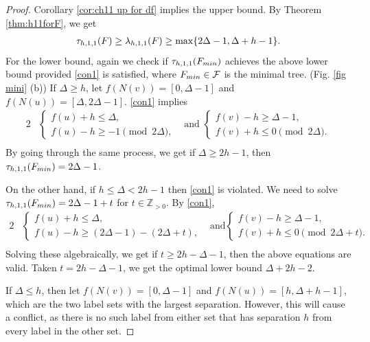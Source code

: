 \begin{proof}
Corollary \ref{cor:ch11 up for df} implies the upper bound. By Theorem \ref{thm:h11forF}, we get 
\begin{align*}
\tau_{h,1,1}(F) \ge \lambda_{h,1,1}(F) \ge \max\{2\Delta-1, \Delta+h-1\}.
\end{align*}
For the lower bound, again we check if $\tau_{h,1,1}(F_{min})$ achieves the above lower bound provided \eqref{con1} is satisfied, where $F_{min} \in {\cal F}$ is the minimal tree. (Fig. \ref{fig mini} (b)) If $\Delta \ge h$, let $f(N(v)) = [0,\Delta-1]$ and $f(N(u)) = [\Delta, 2\Delta-1]$. \eqref{con1} implies 
\begin{alignat*}{2}
 &\begin{cases}
 f(u) + h \le \Delta, \\ 
 f(u) -h \ge -1 \pmod{2\Delta},
 \end{cases}
 &\text{and    } 
 \begin{cases}
 f(v) - h \ge \Delta-1 ,\\
 f(v) + h \le 0 \pmod{2\Delta}.
 \end{cases} \\
\end{alignat*}
By going through the same process, we get if $\Delta \ge 2h-1$, then $\tau_{h,1,1}(F_{min}) = 2\Delta -1$.

On the other hand, if $h \le \Delta < 2h-1$ then \eqref{con1} is violated. We need to solve $\tau_{h,1,1}(F_{min}) = 2\Delta-1+t$ for $t \in \mathbb{Z}_{>0}$. By \eqref{con1},
\begin{alignat*}{2}
 &\begin{cases}
 f(u) + h \le \Delta, \\ 
 f(u) -h \ge (2\Delta-1)-(2\Delta+t),
 \end{cases}
 & \text{and}
 \begin{cases}
 f(v) - h \ge \Delta -1 ,\\
f(v) +h \le 0 \pmod{2\Delta+t}.
 \end{cases} \\
\end{alignat*}
Solving these algebraically, we get if $t \ge 2h-\Delta-1$, then the above equations are valid. Taken $t = 2h-\Delta-1$, we get the optimal lower bound $\Delta + 2h-2$. 

If $\Delta \le h$, then let $f(N(v)) = [0,\Delta-1]$ and $f(N(u)) = [h, \Delta+h-1]$, which are the two label sets with the largest separation. However, this will cause a conflict, as there is no such label from either set that has separation $h$ from every label in the other set. 


\end{proof}
